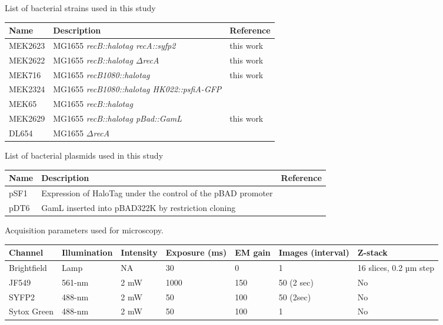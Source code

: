\clearpage

\setlength\intextsep{40pt}


\begin{supptable}[htbp]
    \centering
    \caption{List of bacterial strains used in this study}
    \begin{tabular}{lll}
        \toprule
        Name & Description & Reference\\
        \midrule
        MEK2623 & MG1655 \textit{recB::halotag recA::syfp2} & this work\\
        MEK2622 & MG1655 \textit{recB::halotag $\Delta$recA} & this work \\ %
        MEK716 & MG1655 \textit{recB1080::halotag} & this work \\ %
        MEK2324 & MG1655 \textit{recB1080::halotag HK022::psfiA-GFP} &~\cite{Lepore2025} \\
        MEK65 & MG1655 \textit{recB::halotag} &~\cite{Lepore2019a} \\
        MEK2629 & MG1655 \textit{recB::halotag pBad::GamL} & this work \\ %
        DL654 & MG1655 \textit{$\Delta$recA} &~\cite{Wertman1986} \\
        \bottomrule
    \end{tabular}\label{SItab:strains}
\end{supptable}

\begin{supptable}[htbp]
    \centering
    \caption{List of bacterial plasmids used in this study}
    \begin{tabular}{lll}
        \toprule
        Name & Description & Reference\\
        \midrule
        pSF1 & Expression of HaloTag under the control of the pBAD promoter &~\cite{Lepore2019a} \\
        pDT6 & GamL inserted into pBAD322K by restriction cloning &~\cite{Wilkinson2016} \\
        \bottomrule
    \end{tabular}\label{SItab:plasmids}
\end{supptable}

\begin{supptable}[htbp]
    \centering
    \caption{Acquisition parameters used for microscopy.}
    \begin{tabular}{lllllll}
        \toprule
        Channel & Illumination & Intensity & Exposure (ms) & EM gain & Images (interval) & Z-stack\\
        \midrule
        Brightfield & Lamp & NA & 30 & 0 & 1 & 16 slices, 0.2 µm step\\
        JF549 & 561-nm & 2 mW & 1000 & 150 & 50 (2 sec) & No\\
        SYFP2 & 488-nm & 2 mW & 50 & 100 & 50 (2sec) & No\\
        Sytox Green & 488-nm & 2 mW & 50 & 100 & 1 & No\\
        \bottomrule
    \end{tabular}\label{SItab:acquisition_channels}
\end{supptable}

